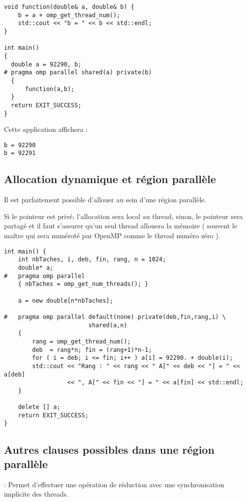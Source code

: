 \documentclass[fleqn,11pt]{article}
\begin{document}
\begin{lstlisting}
void function(double& a, double& b) {
    b = a + omp_get_thread_num();
    std::cout << "b = " << b << std::endl;
}

int main()
{
  double a = 92290, b;
# pragma omp parallel shared(a) private(b)
  {
      function(a,b);
  }
  return EXIT_SUCCESS;
}
\end{lstlisting}

Cette application affichera :
\begin{verbatim}
b = 92290
b = 92291
\end{verbatim}

\subsection{Allocation dynamique et région parallèle}

Il est parfaitement possible d'allouer au sein d'une région parallèle.

Si le pointeur est privé, l'allocation sera local au thread, sinon, le pointeur sera partagé et il faut s'assurer qu'un
seul thread allouera la mémoire ( souvent le maître qui sera numéroté par OpenMP comme le thread numéro zéro ).

\begin{lstlisting}
int main() {
    int nbTaches, i, deb, fin, rang, n = 1024;
    double* a;
#   pragma omp parallel
    { nbTaches = omp_get_num_threads(); }

    a = new double[n*nbTaches];
    
#   pragma omp parallel default(none) private(deb,fin,rang,i) \
                        shared(a,n)
    {
        rang = omp_get_thread_num();
        deb  = rang*n; fin = (rang+1)*n-1;
        for ( i = deb; i <= fin; i++ ) a[i] = 92290. + double(i);
        std::cout << "Rang : " << rang << " A[" << deb << "] = " << a[deb]
                  << ", A[" << fin << "] = " << a[fin] << std::endl;
    }
    
    delete [] a;
    return EXIT_SUCCESS;
}
\end{lstlisting}

\subsection{Autres clauses possibles dans une région parallèle}

 : Permet d'effectuer une opération de réduction avec une synchronisation implicite des threads.
\end{document}
